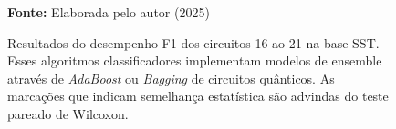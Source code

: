 \begin{figure}
\caption{Resultados do desempenho F1 dos circuitos 16 ao 21 na base \gls{SST}. Esses algoritmos classificadores implementam modelos de ensemble através de \textit{AdaBoost} ou \textit{Bagging} de circuitos quânticos. As marcações que indicam semelhança estatística são advindas do teste pareado de Wilcoxon.}
\label{fig:f1:sst:g6}
     \centering
    \centering

      \par\medskip\ABNTEXfontereduzida\selectfont\textbf{Fonte:} Elaborada pelo autor (2025) \par\medskip
\end{figure}